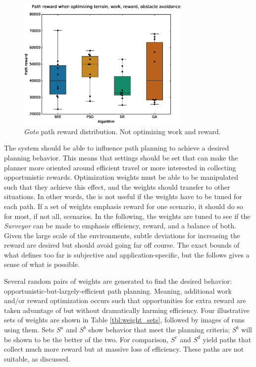 \documentclass{tamuccthesis}
\begin{document}
\begin{figure}[H]
    \captionsetup{justification=centering}
    \centering
    \includegraphics[width=0.75\textwidth,trim={0cm 0.75cm 0cm 0.75cm},clip]{EXP3_histo_reward_b.eps}
    \caption{\textit{Goto} path reward distribution. Not optimizing work and reward. }
    \label{fig:algcompare_b_reward}
\end{figure}


The system should be able to influence path planning to achieve a desired planning behavior. This means that settings should be set that can make the planner more oriented around efficient travel or more interested in collecting opportunistic rewards. Optimization weights must be able to be manipulated such that they achieve this effect, and the weights should transfer to other situations. In other words, the is not useful if the weights have to be tuned for each path. If a set of weights emphasis reward for one scenario, it should do so for most, if not all, scenarios. In the following, the weights are tuned to see if the \textit{Surveyor} can be made to emphasis efficiency, reward, and a balance of both. Given the large scale of the environments, subtle deviations for increasing the reward are desired but should avoid going far off course. The exact bounds of what defines too far is subjective and application-specific, but the follows gives a sense of what is possible. 

Several random pairs of weights are generated to find the desired behavior: opportunistic-but-largely-efficient path planning. Meaning, additional work and/or reward optimization occurs such that opportunities for extra reward are taken advantage of but without dramatically harming efficiency. Four illustrative sets of weights are shown in Table \ref{tbl:weight_sets}, followed by images of runs using them. Sets $S^a$ and $S^b$ show behavior that meet the planning criteria; $S^b$ will be shown to be the better of the two. For comparison, $S^c$ and $S^d$ yield paths that collect much more reward but at massive loss of efficiency. These paths are not suitable, as discussed. 
\end{document}
